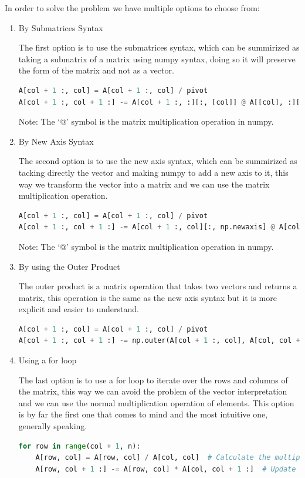 In order to solve the problem we have multiple options to choose from:


\begin{enumerate}
    \item By Submatrices Syntax
    
    The first option is to use the submatrices syntax, which can be summirized as taking a submatrix of a matrix using numpy syntax, doing so it will preserve the form of the matrix and not as a vector.

    \begin{lstlisting}[language=Python]
A[col + 1 :, col] = A[col + 1 :, col] / pivot
A[col + 1 :, col + 1 :] -= A[col + 1 :, :][:, [col]] @ A[[col], :][:, col + 1 :]
    \end{lstlisting}

    Note: The `@' symbol is the matrix multiplication operation in numpy.
    \item By New Axis Syntax
    
    The second option is to use the new axis syntax, which can be summirized as tacking directly the vector and making numpy to add a new axis to it, this way we transform the vector into a matrix and we can use the matrix multiplication operation.
    
    \begin{lstlisting}[language=Python]
A[col + 1 :, col] = A[col + 1 :, col] / pivot
A[col + 1 :, col + 1 :] -= A[col + 1 :, col][:, np.newaxis] @ A[col, col + 1 :][np.newaxis, :]
    \end{lstlisting}


    Note: The `@' symbol is the matrix multiplication operation in numpy.
    \item By using the Outer Product
    
    The outer product is a matrix operation that takes two vectors and returns a matrix, this operation is the same as the new axis syntax but it is more explicit and easier to understand.


    \begin{lstlisting}[language=Python]
A[col + 1 :, col] = A[col + 1 :, col] / pivot
A[col + 1 :, col + 1 :] -= np.outer(A[col + 1 :, col], A[col, col + 1 :])
    \end{lstlisting}

    \item Using a for loop
    
    The last option is to use a for loop to iterate over the rows and columns of the matrix, this way we can avoid the problem of the vector interpretation and we can use the normal multiplication operation of elements. This option is by far the first one that comes to mind and the most intuitive one, generally speaking.

    \begin{lstlisting}[language=Python]
for row in range(col + 1, n):
    A[row, col] = A[row, col] / A[col, col]  # Calculate the multiplier and store in A for later use
    A[row, col + 1 :] -= A[row, col] * A[col, col + 1 :]  # Update the remaining elements in the row using the multiplier
    \end{lstlisting} 
\end{enumerate}

